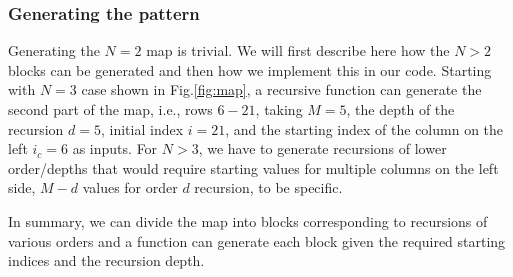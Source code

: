 \documentclass[final,twocolumn]{elsarticle}
\begin{document}
\begin{small}
\subsubsection{Generating the pattern}
Generating the $N=2$ map is trivial. 
We will first describe here how the $N>2$ blocks can be generated
and then how we implement this in our code.
Starting with $N=3$ case shown in Fig.\ref{fig:map}, 
a recursive function can generate the second part of the map, i.e., rows $6-21$,
 taking $M=5$, the depth of the recursion $d=5$, initial index $i=21$, and the starting index of the column on the left $i_c = 6$ as inputs. 
For $N>3$, we have to generate recursions of lower order/depths that would require starting values for multiple columns on the left side, $M-d$ values for order $d$ recursion, to be specific. 

In summary,
we can divide the map into blocks corresponding to recursions of various orders
and a function can generate each block given the required starting indices 
and the recursion depth. %


\end{small}
\end{document}
